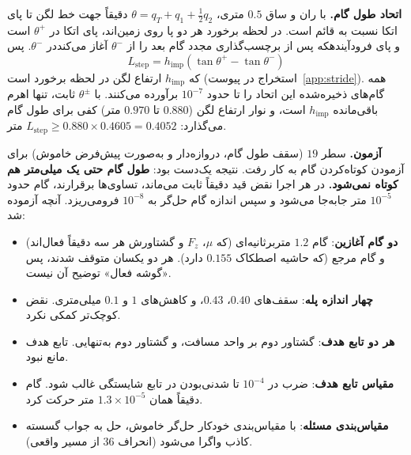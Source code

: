 \documentclass[10pt,twocolumn]{article}
\newcommand{\md}{\lr{\textemdash}}
\begin{document}
\textbf{اتحاد طول گام.} با ران و ساق $0.5$ متری، $\theta=q_T+q_1+\tfrac12q_2$ دقیقاً جهت
خط لگن تا پای اتکا نسبت به قائم است. در لحظه برخورد هر دو پا روی زمین‌اند، پای اتکا در
$\theta^+$ است و پای فرودآینده\md{}که پس از برچسب‌گذاری مجدد گام بعد را از $\theta^-$ آغاز
می‌کند\md{}در $\theta^-$. پس
\begin{equation}
L_{\mathrm{step}} = h_{\mathrm{imp}}\left(\tan\theta^+ - \tan\theta^-\right)
\label{eq:stride}
\end{equation}
که $h_{\mathrm{imp}}$ ارتفاع لگن در لحظه برخورد است (استخراج در پیوست~\ref{app:stride}).
همه گام‌های ذخیره‌شده این اتحاد را تا حدود $10^{-7}$ برآورده می‌کنند. با $\theta^\pm$ ثابت،
تنها اهرم باقی‌مانده $h_{\mathrm{imp}}$ است، و نوار ارتفاع لگن ($0.880$ تا $0.970$ متر) کفی
برای طول گام می‌گذارد: $L_{\mathrm{step}}\ge0.880\times0.4605=0.4052$ متر.

\textbf{آزمون.} سطر $19$ (سقف طول گام، دروازه‌دار و به‌صورت پیش‌فرض خاموش) برای آزمودن
کوتاه‌کردن گام به کار رفت. نتیجه یک‌دست بود: \textbf{طول گام حتی یک میلی‌متر هم کوتاه
نمی‌شود.} در هر اجرا نقض قید دقیقاً ثابت می‌ماند، تساوی‌ها برقرارند، گام حدود $10^{-5}$ متر
جابه‌جا می‌شود و سپس اندازه گام حل‌گر به $10^{-8}$ فرومی‌ریزد. آنچه آزموده شد:

\begin{itemize}\renewcommand{\labelitemi}{\lr{\textbullet}}
    \item \textbf{دو گام آغازین}: گام $1.2$ متربرثانیه‌ای (که $\mu$، $F_z$ و گشتاورش
          هر سه دقیقاً فعال‌اند) و گام مرجع (که حاشیه اصطکاک $0.155$ دارد).
          هر دو یکسان متوقف شدند، پس «گوشه فعال» توضیح آن نیست.
    \item \textbf{چهار اندازه پله}: سقف‌های $0.40$، $0.43$، و کاهش‌های $1$ و
          $0.1$ میلی‌متری. نقض کوچک‌تر کمکی نکرد.
    \item \textbf{هر دو تابع هدف}: گشتاور دوم بر واحد مسافت، و گشتاور دوم به‌تنهایی.
          تابع هدف مانع نبود.
    \item \textbf{مقیاس تابع هدف}: ضرب در $10^{-4}$ تا شدنی‌بودن در تابع شایستگی غالب
          شود. گام دقیقاً همان $1.3\times10^{-5}$ متر حرکت کرد.
    \item \textbf{مقیاس‌بندی مسئله}: با مقیاس‌بندی خودکار حل‌گر خاموش، حل به جواب گسسته
          کاذب واگرا می‌شود (انحراف $36$ از مسیر واقعی).
\end{itemize}
\end{document}
